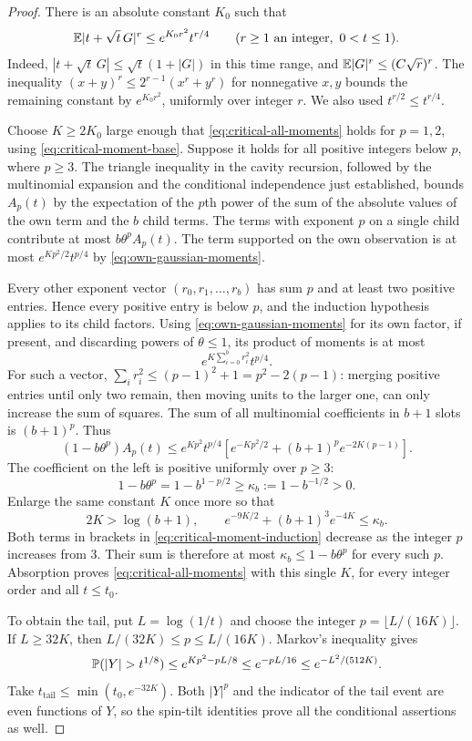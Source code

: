 \begin{proof}
There is an absolute constant $K_0$ such that
\begin{equation}
 \mathbb E|t+\sqrt t\,G|^r\le e^{K_0r^2}t^{r/4}
 \qquad(r\ge1\text{ an integer},\ 0<t\le1).
 \label{eq:own-gaussian-moments}
\end{equation}
Indeed, $|t+\sqrt t\,G|\le\sqrt t(1+|G|)$ in this time range,
and $\mathbb E|G|^r\le(C\sqrt r)^r$.  The inequality
$(x+y)^r\le2^{r-1}(x^r+y^r)$ for nonnegative $x,y$ bounds the
remaining constant by $e^{K_0r^2}$, uniformly over integer $r$.
We also used $t^{r/2}\le t^{r/4}$.

Choose $K\ge2K_0$ large enough that \eqref{eq:critical-all-moments}
holds for $p=1,2$, using \eqref{eq:critical-moment-base}.  Suppose it
holds for all positive integers below $p$, where $p\ge3$.
The triangle inequality in the cavity recursion, followed by the
multinomial expansion and the conditional independence just established,
bounds $A_p(t)$ by the expectation of the $p$th power of the sum of
the absolute values of the own term and the $b$ child terms.
The terms with exponent $p$ on a single child contribute at most
$b\theta^p A_p(t)$.  The term supported on the own observation is at
most $e^{Kp^2/2}t^{p/4}$ by \eqref{eq:own-gaussian-moments}.

Every other exponent vector $(r_0,r_1,\ldots,r_b)$ has sum $p$ and
at least two positive entries.  Hence every positive entry is below
$p$, and the induction hypothesis applies to its child factors.
Using \eqref{eq:own-gaussian-moments} for its own factor, if present,
and discarding powers of $\theta\le1$, its product of moments is at
most
\[
 e^{K\sum_{i=0}^b r_i^2}t^{p/4}.
\]
For such a vector,
$\sum_i r_i^2\le(p-1)^2+1=p^2-2(p-1)$: merging positive entries
until only two remain, then moving units to the larger one, can only
increase the sum of squares.  The sum of all multinomial coefficients
in $b+1$ slots is $(b+1)^p$.  Thus
\begin{equation}
 (1-b\theta^p)A_p(t)
 \le e^{Kp^2}t^{p/4}
   \left[e^{-Kp^2/2}+(b+1)^p e^{-2K(p-1)}\right].
 \label{eq:critical-moment-induction}
\end{equation}
The coefficient on the left is positive uniformly over $p\ge3$:
\[
 1-b\theta^p=1-b^{1-p/2}\ge\kappa_b:=1-b^{-1/2}>0.
\]
Enlarge the same constant $K$ once more so that
\[
 2K>\log(b+1),\qquad
 e^{-9K/2}+(b+1)^3e^{-4K}\le\kappa_b.
\]
Both terms in brackets in \eqref{eq:critical-moment-induction}
decrease as the integer $p$ increases from $3$.  Their sum is
therefore at most $\kappa_b\le1-b\theta^p$ for every such $p$.
Absorption proves \eqref{eq:critical-all-moments} with this single
$K$, for every integer order and all $t\le t_0$.

To obtain the tail, put $L=\log(1/t)$ and choose the integer
$p=\lfloor L/(16K)\rfloor$.  If $L\ge32K$, then
$L/(32K)\le p\le L/(16K)$.  Markov's inequality gives
\[
 \P(|Y|>t^{1/8})
 \le e^{Kp^2-pL/8}
 \le e^{-pL/16}
 \le e^{-L^2/(512K)}.
\]
Take $t_{\mathrm{tail}}\le\min(t_0,e^{-32K})$.
Both $|Y|^p$ and the indicator of the tail event are even functions
of $Y$, so the spin-tilt identities prove all the conditional
assertions as well.
\end{proof}

